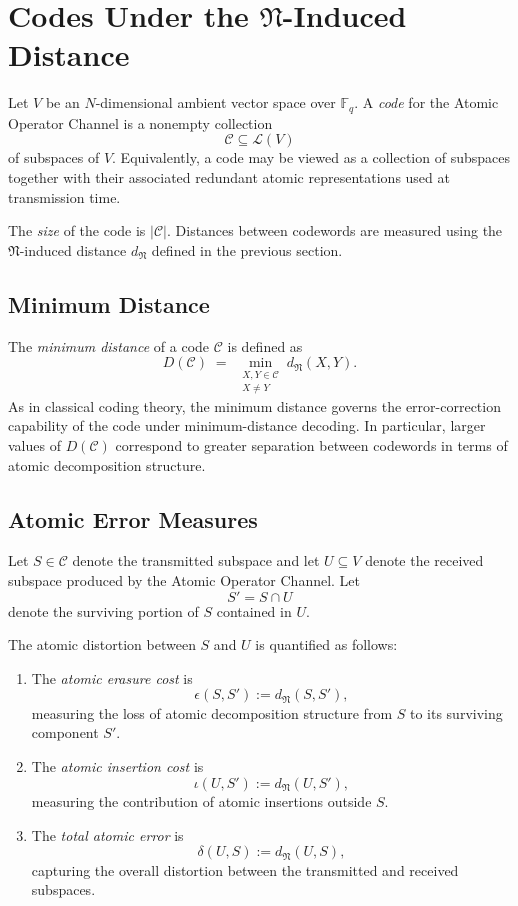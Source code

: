 \documentclass{svproc}
\begin{document}
\section{Codes Under the $\mathfrak{N}$-Induced Distance} \label{sec:codeundermetric}


Let $V$ be an $N$-dimensional ambient vector space over $\mathbb{F}_q$.
A \emph{code} for the Atomic Operator Channel is a nonempty collection
\[
\mathcal C \subseteq \mathcal L(V)
\]
of subspaces of $V$.
Equivalently, a code may be viewed as a collection of subspaces together with
their associated redundant atomic representations used at
transmission time.

The \emph{size} of the code is $|\mathcal C|$.
Distances between codewords are measured using the $\mathfrak N$-induced
distance $d_{\mathfrak N}$ defined in the previous section.

\subsection{Minimum Distance}

The \emph{minimum distance} of a code $\mathcal C$ is defined as
\[
D(\mathcal C)
\;=\;
\min_{\substack{X,Y\in\mathcal C \\ X\neq Y}}
d_{\mathfrak N}(X,Y).
\]
As in classical coding theory, the minimum distance governs the error-correction
capability of the code under minimum-distance decoding.
In particular, larger values of $D(\mathcal C)$ correspond to greater
separation between codewords in terms of atomic decomposition structure.

\subsection{Atomic Error Measures}

Let $S \in \mathcal C$ denote the transmitted subspace and let $U \subseteq V$
denote the received subspace produced by the Atomic Operator Channel.
Let
\[
S' = S \cap U
\]
denote the surviving portion of $S$ contained in $U$.

\begin{definition}
The atomic distortion between $S$ and $U$ is quantified as follows:
\begin{enumerate}
    \item The \emph{atomic erasure cost} is
    \[
    \epsilon(S,S') := d_{\mathfrak N}(S,S'),
    \]
    measuring the loss of atomic decomposition structure from $S$ to its
    surviving component $S'$.
    
    \item The \emph{atomic insertion cost} is
    \[
    \iota(U,S') := d_{\mathfrak N}(U,S'),
    \]
    measuring the contribution of atomic insertions outside $S$.
    
    \item The \emph{total atomic error} is
    \[
    \delta(U,S) := d_{\mathfrak N}(U,S),
    \]
    capturing the overall distortion between the transmitted and received
    subspaces.
\end{enumerate}
\end{definition} 
\end{document}
